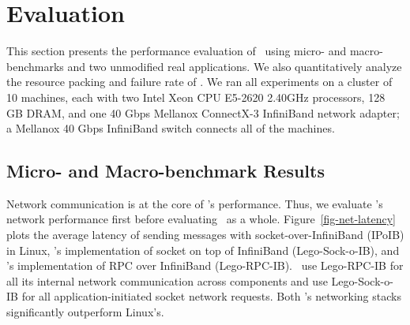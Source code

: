 \documentclass[10pt,times,twocolumn]{z2-article}
\begin{document}
{{{{{{{\section{Evaluation}
\label{sec:results}

This section presents the performance evaluation of \lego\ using micro- and macro-benchmarks and two unmodified real applications.
We also quantitatively analyze the resource packing and failure rate of \lego.
We ran all experiments on a cluster of 10 machines, each with two Intel Xeon CPU E5-2620 2.40GHz
processors, 128 GB DRAM, and one 40 Gbps Mellanox ConnectX-3 InfiniBand network adapter;
a Mellanox 40 Gbps InfiniBand switch connects all of the machines. 

\subsection{Micro- and Macro-benchmark Results}
Network communication is at the core of \lego's performance.
Thus, we evaluate \lego's network performance first before evaluating \lego\ as a whole.
Figure~\ref{fig-net-latency} plots the average latency of sending messages with socket-over-InfiniBand (IPoIB) in Linux,
\lego's implementation of socket on top of InfiniBand (Lego-Sock-o-IB), and \lego's implementation of RPC over InfiniBand (Lego-RPC-IB).
\lego\ use Lego-RPC-IB for all its internal network communication across components and use Lego-Sock-o-IB for 
all application-initiated socket network requests.
Both \lego's networking stacks significantly outperform Linux's.

}}}}}}}
\end{document}
